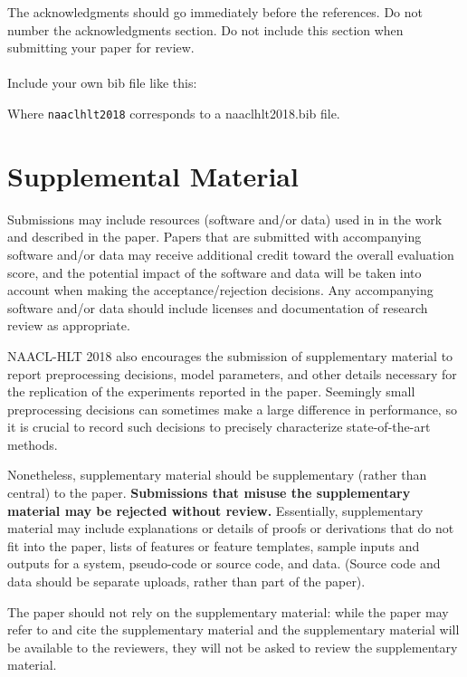The acknowledgments should go immediately before the references.  Do
not number the acknowledgments section. Do not include this section
when submitting your paper for review. \\

 \\

Include your own bib file like this:
\verb||
\verb||

Where \verb|naaclhlt2018| corresponds to a naaclhlt2018.bib file.



\appendix

\section{Supplemental Material}
\label{sec:supplemental}
Submissions may include resources (software and/or data) used in in the work and described in the paper. Papers that are submitted with accompanying software and/or data may receive additional credit toward the overall evaluation score, and the potential impact of the software and data will be taken into account when making the acceptance/rejection decisions. Any accompanying software and/or data should include licenses and documentation of research review as appropriate.


NAACL-HLT 2018 also encourages the submission of supplementary material to report preprocessing decisions, model parameters, and other details necessary for the replication of the experiments reported in the paper. Seemingly small preprocessing decisions can sometimes make a large difference in performance, so it is crucial to record such decisions to precisely characterize state-of-the-art methods. 

Nonetheless, supplementary material should be supplementary (rather
than central) to the paper. {\bf Submissions that misuse the supplementary 
material may be rejected without review.}
Essentially, supplementary material may include explanations or details
of proofs or derivations that do not fit into the paper, lists of
features or feature templates, sample inputs and outputs for a system,
pseudo-code or source code, and data. (Source code and data should
be separate uploads, rather than part of the paper).

The paper should not rely on the supplementary material: while the paper
may refer to and cite the supplementary material and the supplementary material will be available to the
reviewers, they will not be asked to review the
supplementary material.

